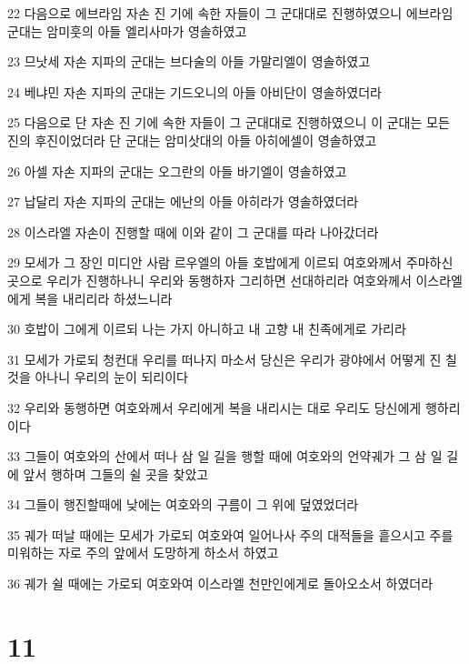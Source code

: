 \par 22 다음으로 에브라임 자손 진 기에 속한 자들이 그 군대대로 진행하였으니 에브라임 군대는 암미훗의 아들 엘리사마가 영솔하였고
\par 23 므낫세 자손 지파의 군대는 브다술의 아들 가말리엘이 영솔하였고
\par 24 베냐민 자손 지파의 군대는 기드오니의 아들 아비단이 영솔하였더라
\par 25 다음으로 단 자손 진 기에 속한 자들이 그 군대대로 진행하였으니 이 군대는 모든 진의 후진이었더라 단 군대는 암미삿대의 아들 아히에셀이 영솔하였고
\par 26 아셀 자손 지파의 군대는 오그란의 아들 바기엘이 영솔하였고
\par 27 납달리 자손 지파의 군대는 에난의 아들 아히라가 영솔하였더라
\par 28 이스라엘 자손이 진행할 때에 이와 같이 그 군대를 따라 나아갔더라
\par 29 모세가 그 장인 미디안 사람 르우엘의 아들 호밥에게 이르되 여호와께서 주마하신 곳으로 우리가 진행하나니 우리와 동행하자 그리하면 선대하리라 여호와께서 이스라엘에게 복을 내리리라 하셨느니라
\par 30 호밥이 그에게 이르되 나는 가지 아니하고 내 고향 내 친족에게로 가리라
\par 31 모세가 가로되 청컨대 우리를 떠나지 마소서 당신은 우리가 광야에서 어떻게 진 칠 것을 아나니 우리의 눈이 되리이다
\par 32 우리와 동행하면 여호와께서 우리에게 복을 내리시는 대로 우리도 당신에게 행하리이다
\par 33 그들이 여호와의 산에서 떠나 삼 일 길을 행할 때에 여호와의 언약궤가 그 삼 일 길에 앞서 행하며 그들의 쉴 곳을 찾았고
\par 34 그들이 행진할때에 낮에는 여호와의 구름이 그 위에 덮였었더라
\par 35 궤가 떠날 때에는 모세가 가로되 여호와여 일어나사 주의 대적들을 흩으시고 주를 미워하는 자로 주의 앞에서 도망하게 하소서 하였고
\par 36 궤가 쉴 때에는 가로되 여호와여 이스라엘 천만인에게로 돌아오소서 하였더라

\chapter{11}


